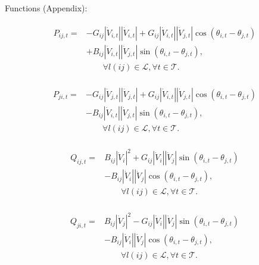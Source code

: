 \documentclass{article}
\begin{document}
Functions (Appendix):
{\allowdisplaybreaks
\begin{align}
  \begin{split}
  P_{ij,t} = &-G_{ij} \left|\dot{V}_{i,t} \right| \left|\dot{V}_{i,t} \right| 
  + G_{ij} \left|\dot{V}_{i,t} \right| \left|\dot{V}_{j,t} \right| \cos\left(\theta_{i,t}-\theta_{j,t} \right) \\
  &+ B_{ij} \left|\dot{V}_{i,t} \right| \left|\dot{V}_{j,t} \right| \sin\left(\theta_{i,t}-\theta_{j,t} \right), 
  \\ & \quad \quad\forall l(ij) \in \mathcal{L}, \forall t \in \mathcal{T}.
  \end{split}
\end{align}


\begin{align}
  \begin{split}
  P_{ji,t}=&-G_{ij} \left|\dot{V}_{j,t} \right| \left|\dot{V}_{j,t} \right| 
  + G_{ij} \left|\dot{V}_{i,t} \right| \left|\dot{V}_{j,t} \right| \cos\left(\theta_{i,t}-\theta_{j,t} \right)\\
  &- B_{ij} \left|\dot{V}_{i,t} \right| \left|\dot{V}_{j,t} \right| \sin\left(\theta_{i,t}-\theta_{j,t} \right),
  \\ & \quad \quad\forall l(ij) \in \mathcal{L}, \forall t \in \mathcal{T}.
  \end{split}
\end{align}

\begin{align}
  \begin{split}
    Q_{ij,t}=&B_{ij}\left\lvert \dot{V}_{i}\right\rvert^{2} + G_{ij}\left\lvert \dot{V}_{i}\right\rvert\left\lvert \dot{V}_{j}\right\rvert \sin{\left(\theta_{i,t}-\theta_{j,t}\right)} \\
    &- B_{ij}\left\lvert \dot{V}_{i}\right\rvert\left\lvert \dot{V}_{j}\right\rvert \cos{\left(\theta_{i,t}-\theta_{j,t}\right)},  
    \\ & \quad \quad\forall l(ij) \in \mathcal{L}, \forall t \in \mathcal{T}.
  \end{split}
\end{align}

\begin{align}
  \begin{split}
    Q_{ji,t}=&B_{ij}\left\lvert \dot{V}_{j}\right\rvert^{2} - G_{ij}\left\lvert \dot{V}_{i}\right\rvert\left\lvert \dot{V}_{j}\right\rvert \sin{\left(\theta_{i,t}-\theta_{j,t}\right)} \\
    &- B_{ij}\left\lvert \dot{V}_{i}\right\rvert\left\lvert \dot{V}_{j}\right\rvert \cos{\left(\theta_{i,t}-\theta_{j,t}\right)},  
    \\ & \quad \quad  \forall l(ij) \in \mathcal{L}, \forall t \in \mathcal{T}.
  \end{split}
\end{align}
}
\end{document}
